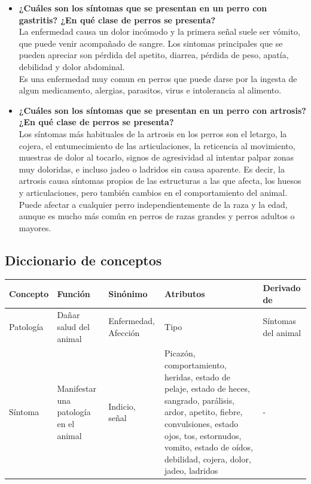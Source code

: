 \documentclass[a4paper,table,xcdraw]{article}
\begin{document}
\begin{itemize}
    \item \textbf{¿Cuáles son los síntomas que se presentan en un perro con gastritis? ¿En qué clase de perros se presenta?}\\
    La enfermedad causa un dolor incómodo y la primera señal suele ser vómito, que puede venir acompañado de sangre. Los sintomas principales que se pueden apreciar son pérdida del apetito, diarrea, pérdida de peso, apatía, debilidad y dolor abdominal.\\
    Es una enfermedad muy comun en perros que puede darse por la ingesta de algun medicamento, alergias, parasitos, virus e intolerancia al alimento.
    \item \textbf{¿Cuáles son los síntomas que se presentan en un perro con artrosis? ¿En qué clase de perros se presenta?}\\
    Los síntomas más habituales de la artrosis en los perros son el letargo, la cojera, el entumecimiento de las articulaciones, la reticencia al movimiento, muestras de dolor al tocarlo, signos de agresividad al intentar palpar zonas muy doloridas, e incluso jadeo o ladridos sin causa aparente. Es decir, la artrosis causa síntomas propios de las estructuras a las que afecta, los huesos y articulaciones, pero también cambios en el comportamiento del animal.\\
    Puede afectar a cualquier perro independientemente de la raza y la edad, aunque es mucho más común en perros de razas grandes y perros adultos o mayores.    
\end{itemize}

\subsection{Diccionario de conceptos}
\begin{table}[H]
\centering
\begin{tabular}{|l|p{2cm}|p{2cm}|p{4cm}|p{2cm}|}
\hline
\textbf{Concepto} & \textbf{Función}      & \textbf{Sinónimo}    & \textbf{Atributos} & \textbf{Derivado de} \\ \hline
Patología & Dañar salud del animal & Enfermedad, Afección & Tipo & Síntomas del animal  \\ \hline
Síntoma & Manifestar una patología en el animal & Indicio, señal & Picazón, comportamiento, heridas, estado de pelaje, estado de heces, sangrado, parálisis, ardor, apetito, fiebre, convulsiones, estado ojos, tos, estornudos, vomito, estado de oídos, debilidad, cojera, dolor, jadeo, ladridos & -\\ \hline
\end{tabular}
\end{table}
\end{document}

